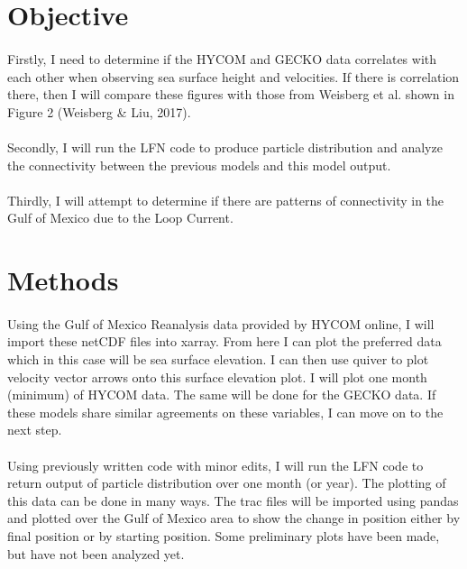 \documentclass{article}
\begin{document}
\section{Objective}
\label{sec:headings}
\paragraph{}
Firstly, I need to determine if the HYCOM and GECKO data correlates with each other when observing sea surface height and velocities. If there is correlation there, then I will compare these figures with those from Weisberg et al. shown in Figure 2 (Weisberg & Liu, 2017).
\paragraph{} 
Secondly, I will run the LFN code to produce particle distribution and analyze the connectivity between the previous models and this model output.
\paragraph{}
Thirdly, I will attempt to determine if there are patterns of connectivity in the Gulf of Mexico due to the Loop Current.

\section{Methods}
\paragraph{}
Using the Gulf of Mexico Reanalysis data provided by HYCOM online, I will import these netCDF files into xarray. From here I can plot the preferred data which in this case will be sea surface elevation. I can then use quiver to plot velocity vector arrows onto this surface elevation plot. I will plot one month (minimum) of HYCOM data. The same will be done for the GECKO data. If these models share similar agreements on these variables, I can move on to the next step.
\paragraph{}	
Using previously written code with minor edits, I will run the LFN code to return output of particle distribution over one month (or year). The plotting of this data can be done in many ways. The trac files will be imported using pandas and plotted over the Gulf of Mexico area to show the change in position either by final position or by starting position. Some preliminary plots have been made, but have not been analyzed yet. 
\end{document}
